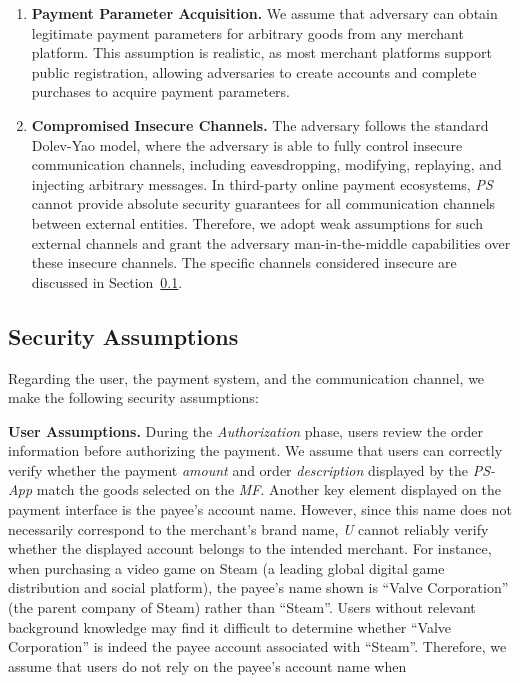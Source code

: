 \documentclass[journal]{IEEEtran}
\providecommand{\DIFaddtex}[1]{{\protect\color{blue}\uwave{#1}}} %
\providecommand{\DIFaddbegin}{} %
\providecommand{\DIFaddend}{} %
\providecommand{\DIFadd}[1]{\texorpdfstring{\DIFaddtex{#1}}{#1}} %
\providecommand{\DIFaddincludegraphics}[2][]{{\color{blue}\fbox{\DIFOincludegraphics[#1]{#2}}}} %
\DeclareRobustCommand{\DIFaddbegin}{\DIFOaddbegin \let\includegraphics\DIFaddincludegraphics} %
\DeclareRobustCommand{\DIFaddend}{\DIFOaddend \let\includegraphics\DIFOincludegraphics} %
\begin{document}
\begin{enumerate}[leftmargin=*]
  \item \textbf{Payment Parameter Acquisition.}
  We assume that \DIFaddbegin \DIFadd{the }\DIFaddend adversary can obtain legitimate payment parameters for arbitrary goods from any merchant platform.
  This assumption is realistic, as most merchant platforms support public registration, allowing adversaries to create accounts and complete purchases to acquire payment parameters.
  \item \textbf{Compromised Insecure Channels.}
  The adversary follows the standard Dolev-Yao model, where the adversary is able to fully control insecure communication channels, including eavesdropping, modifying, replaying, and injecting arbitrary messages.
  In third-party online payment ecosystems, \emph{PS} cannot provide absolute security guarantees for all communication channels between external entities. 
  Therefore, we adopt weak assumptions for such external channels and grant the adversary man-in-the-middle capabilities over these insecure channels. 
  The specific channels considered insecure are discussed in Section~\ref{sec:security_assumptions}.
\end{enumerate}



\subsection{Security Assumptions} \label{sec:security_assumptions}

Regarding the user, the payment system, and the communication channel, we make the following security assumptions:

\textbf{User Assumptions.}
During the \emph{Authorization} phase, users review the order information before authorizing the payment.
We assume that users can correctly verify whether the payment \emph{amount} and order \emph{description} displayed by the \emph{PS-App} match the goods selected on the \emph{MF}.
Another key element displayed on the payment interface is the payee's account name. 
However, since this name does not necessarily correspond to the merchant's brand name, \emph{U} cannot reliably verify whether the displayed account belongs to the intended merchant.
For instance, when purchasing a video game on Steam (a leading global digital game distribution and social platform), the payee's name shown is ``Valve Corporation'' (the parent company of Steam) rather than ``Steam''.
Users without relevant background knowledge may find it difficult to determine whether ``Valve Corporation'' is indeed the payee account associated with ``Steam''.
Therefore, we assume that users do not rely on the payee's account name when \DIFaddbegin \DIFadd{authorizing a payment.
}\DIFaddend 
\end{document}

